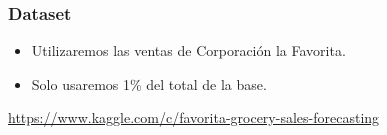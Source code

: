 \documentclass{beamer}
\begin{document}
\begin{frame}
	\frametitle{Dataset}
	\begin{itemize}
		\item Utilizaremos las ventas de Corporación la Favorita.
		\item Solo usaremos 1\% del total de la base. \\
	\end{itemize}	
	\small{\url{https://www.kaggle.com/c/favorita-grocery-sales-forecasting}}
	
\end{frame}
\end{document}
